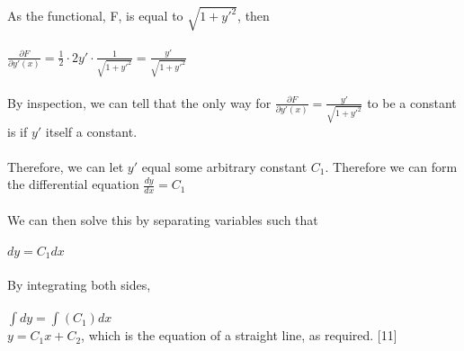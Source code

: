 \documentclass[12pt]{report}
\begin{document}
\\
\\
As the functional, F, is equal to \(\sqrt{1+y'^2}\), then
\\
\\
\(\frac{\partial F}{\partial y'(x)} = \frac{1}{2} \cdot 2y' \cdot \frac{1}{\sqrt{1+y'^2}} = \frac{y'}{\sqrt{1+y'^2}}\)
\\
\\
By inspection, we can tell that the only way for \(\frac{\partial F}{\partial y'(x)} = \frac{y'}{\sqrt{1+y'^2}}\) to be a constant is if \(y'\) itself a constant.
\\
\\
Therefore, we can let \(y'\) equal some arbitrary constant \(C_{1}\). Therefore we can form the differential equation \(\frac{dy}{dx} = C_{1}\)
\\
\\
We can then solve this by separating variables such that
\\
\\
\(dy = C_{1} dx\)
\\
\\
By integrating both sides,
\\
\\
\(\int dy = \int(C_{1}) dx\)
\\
\implies \(y = C_{1}x + C_{2}\), which is the equation of a straight line, as required. [11]
\end{document}
